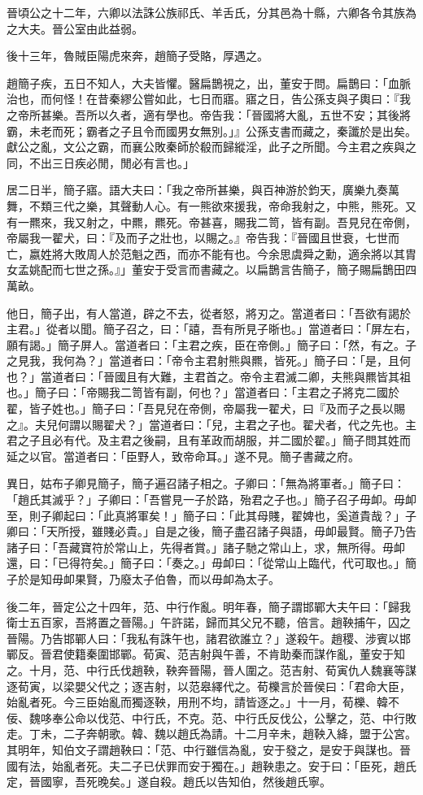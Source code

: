 \begin{pinyinscope}
晉頃公之十二年，六卿以法誅公族祁氏、羊舌氏，分其邑為十縣，六卿各令其族為之大夫。晉公室由此益弱。

後十三年，魯賊臣陽虎來奔，趙簡子受賂，厚遇之。

趙簡子疾，五日不知人，大夫皆懼。醫扁鵲視之，出，董安于問。扁鵲曰：「血脈治也，而何怪！在昔秦繆公嘗如此，七日而寤。寤之日，告公孫支與子輿曰：『我之帝所甚樂。吾所以久者，適有學也。帝告我：「晉國將大亂，五世不安；其後將霸，未老而死；霸者之子且令而國男女無別。」』公孫支書而藏之，秦讖於是出矣。獻公之亂，文公之霸，而襄公敗秦師於殽而歸縱淫，此子之所聞。今主君之疾與之同，不出三日疾必閒，閒必有言也。」

居二日半，簡子寤。語大夫曰：「我之帝所甚樂，與百神游於鈞天，廣樂九奏萬舞，不類三代之樂，其聲動人心。有一熊欲來援我，帝命我射之，中熊，熊死。又有一羆來，我又射之，中羆，羆死。帝甚喜，賜我二笥，皆有副。吾見兒在帝側，帝屬我一翟犬，曰：『及而子之壯也，以賜之。』帝告我：『晉國且世衰，七世而亡，嬴姓將大敗周人於范魁之西，而亦不能有也。今余思虞舜之勳，適余將以其胄女孟姚配而七世之孫。』」董安于受言而書藏之。以扁鵲言告簡子，簡子賜扁鵲田四萬畝。

他日，簡子出，有人當道，辟之不去，從者怒，將刃之。當道者曰：「吾欲有謁於主君。」從者以聞。簡子召之，曰：「譆，吾有所見子晣也。」當道者曰：「屏左右，願有謁。」簡子屏人。當道者曰：「主君之疾，臣在帝側。」簡子曰：「然，有之。子之見我，我何為？」當道者曰：「帝令主君射熊與羆，皆死。」簡子曰：「是，且何也？」當道者曰：「晉國且有大難，主君首之。帝令主君滅二卿，夫熊與羆皆其祖也。」簡子曰：「帝賜我二笥皆有副，何也？」當道者曰：「主君之子將克二國於翟，皆子姓也。」簡子曰：「吾見兒在帝側，帝屬我一翟犬，曰『及而子之長以賜之』。夫兒何謂以賜翟犬？」當道者曰：「兒，主君之子也。翟犬者，代之先也。主君之子且必有代。及主君之後嗣，且有革政而胡服，并二國於翟。」簡子問其姓而延之以官。當道者曰：「臣野人，致帝命耳。」遂不見。簡子書藏之府。

異日，姑布子卿見簡子，簡子遍召諸子相之。子卿曰：「無為將軍者。」簡子曰：「趙氏其滅乎？」子卿曰：「吾嘗見一子於路，殆君之子也。」簡子召子毋卹。毋卹至，則子卿起曰：「此真將軍矣！」簡子曰：「此其母賤，翟婢也，奚道貴哉？」子卿曰：「天所授，雖賤必貴。」自是之後，簡子盡召諸子與語，毋卹最賢。簡子乃告諸子曰：「吾藏寶符於常山上，先得者賞。」諸子馳之常山上，求，無所得。毋卹還，曰：「已得符矣。」簡子曰：「奏之。」毋卹曰：「從常山上臨代，代可取也。」簡子於是知毋卹果賢，乃廢太子伯魯，而以毋卹為太子。

後二年，晉定公之十四年，范、中行作亂。明年春，簡子謂邯鄲大夫午曰：「歸我衛士五百家，吾將置之晉陽。」午許諾，歸而其父兄不聽，倍言。趙鞅捕午，囚之晉陽。乃告邯鄲人曰：「我私有誅午也，諸君欲誰立？」遂殺午。趙稷、涉賓以邯鄲反。晉君使籍秦圍邯鄲。荀寅、范吉射與午善，不肯助秦而謀作亂，董安于知之。十月，范、中行氏伐趙鞅，鞅奔晉陽，晉人圍之。范吉射、荀寅仇人魏襄等謀逐荀寅，以梁嬰父代之；逐吉射，以范皋繹代之。荀櫟言於晉侯曰：「君命大臣，始亂者死。今三臣始亂而獨逐鞅，用刑不均，請皆逐之。」十一月，荀櫟、韓不佞、魏哆奉公命以伐范、中行氏，不克。范、中行氏反伐公，公擊之，范、中行敗走。丁未，二子奔朝歌。韓、魏以趙氏為請。十二月辛未，趙鞅入絳，盟于公宮。其明年，知伯文子謂趙鞅曰：「范、中行雖信為亂，安于發之，是安于與謀也。晉國有法，始亂者死。夫二子已伏罪而安于獨在。」趙鞅患之。安于曰：「臣死，趙氏定，晉國寧，吾死晚矣。」遂自殺。趙氏以告知伯，然後趙氏寧。


\end{pinyinscope}
